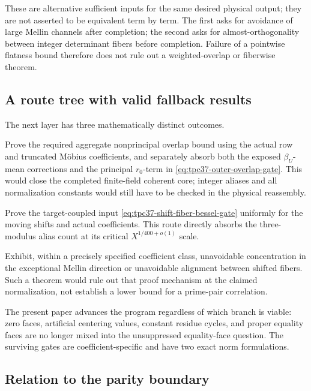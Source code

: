 These are alternative sufficient inputs for the same desired physical
output; they are not asserted to be equivalent term by term.  The first
asks for avoidance of large Mellin channels after completion; the second
asks for almost-orthogonality between integer determinant fibers before
completion.  Failure of a pointwise flatness bound therefore does not
rule out a weighted-overlap or fiberwise theorem.

\subsection{A route tree with valid fallback results}

The next layer has three mathematically distinct outcomes.
\begin{description}[style=nextline,leftmargin=2.4em]
 \item[Positive overlap theorem.]
 Prove the required aggregate nonprincipal overlap bound using the actual
 row and truncated M\"obius coefficients, and separately absorb both the
 exposed \(\beta_U\)-mean corrections and the principal \(r_0\)-term in
 \eqref{eq:tpc37-outer-overlap-gate}.  This would close the completed
 finite-field coherent core; integer aliases and all normalization
 constants would still have to be checked in the physical reassembly.

 \item[Positive shifted-fiber theorem.]
 Prove the target-coupled input
 \eqref{eq:tpc37-shift-fiber-bessel-gate} uniformly for the moving shifts
 and actual coefficients.  This route directly absorbs the three-modulus
 alias count at its critical \(X^{1/400+o(1)}\) scale.

 \item[Scoped obstruction theorem.]
 Exhibit, within a precisely specified coefficient class, unavoidable
 concentration in the exceptional Mellin direction or unavoidable
 alignment between shifted fibers.  Such a theorem would rule out that
 proof mechanism at the claimed normalization, not establish a lower
 bound for a prime-pair correlation.
\end{description}

The present paper advances the program regardless of which branch is
viable: zero faces, artificial centering values, constant residue cycles,
and proper equality faces are no longer mixed into the unsuppressed
equality-face question.  The surviving gates are coefficient-specific and
have two exact norm formulations.

\subsection{Relation to the parity boundary}

